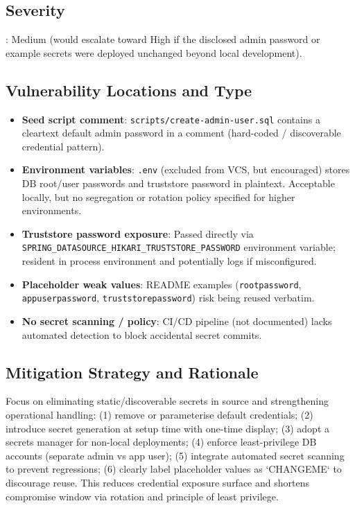 \documentclass[]{UCD_CS_FYP_Report}
\begin{document}
	\subsection{Severity}: Medium (would escalate toward High if the disclosed admin password or example secrets were deployed unchanged beyond local development).

\subsection*{Vulnerability Locations and Type}
\begin{itemize}
		\item \textbf{Seed script comment}: \texttt{scripts/create-admin-user.sql} contains a cleartext default admin password in a comment (hard-coded / discoverable credential pattern).
		\item \textbf{Environment variables}: \texttt{.env} (excluded from VCS, but encouraged) stores DB root/user passwords and truststore password in plaintext. Acceptable locally, but no segregation or rotation policy specified for higher environments.
		\item \textbf{Truststore password exposure}: Passed directly via \texttt{SPRING\_DATASOURCE\_HIKARI\_TRUSTSTORE\_PASSWORD} environment variable; resident in process environment and potentially logs if misconfigured.
		\item \textbf{Placeholder weak values}: README examples (\texttt{rootpassword}, \texttt{appuserpassword}, \texttt{truststorepassword}) risk being reused verbatim.
	\item \textbf{No secret scanning / policy}: CI/CD pipeline (not documented) lacks automated detection to block accidental secret commits.
\end{itemize}

\subsection*{Mitigation Strategy and Rationale}
Focus on eliminating static/discoverable secrets in source and strengthening operational handling: (1) remove or parameterise default credentials; (2) introduce secret generation at setup time with one-time display; (3) adopt a secrets manager for non-local deployments; (4) enforce least-privilege DB accounts (separate admin vs app user); (5) integrate automated secret scanning to prevent regressions; (6) clearly label placeholder values as `CHANGEME` to discourage reuse. This reduces credential exposure surface and shortens compromise window via rotation and principle of least privilege.
\end{document}
